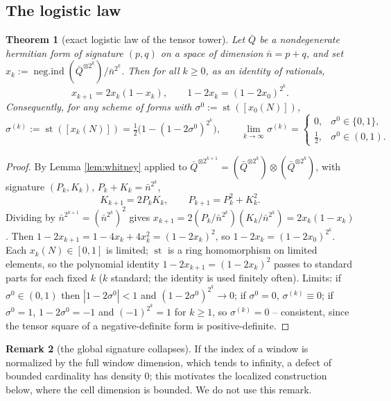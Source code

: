 \documentclass[11pt,reqno]{amsart}
\newtheorem{theorem}{Theorem}[section]
\theoremstyle{definition}
\newtheorem{remark}[theorem]{Remark}
\newcommand{\negind}{\operatorname{neg.ind}}
\newcommand{\sst}{\operatorname{st}}
\begin{document}
\subsection{The logistic law}

\begin{theorem}[exact logistic law of the tensor tower]\label{thm:logistic}
Let \(\bar Q\) be a nondegenerate hermitian form of signature \((p,q)\) on a
space of dimension \(\bar n=p+q\), and set
\(x_k:=\negind(\bar Q^{\otimes 2^k})/\bar n^{2^k}\). Then for all \(k\geq0\), as
an identity of rationals,
\[
x_{k+1}=2x_k(1-x_k),\qquad 1-2x_k=(1-2x_0)^{2^k}.
\]
Consequently, for any scheme of forms with \(\sigma^0:=\sst([x_0(N)])\),
\[
\sigma^{(k)}:=\sst([x_k(N)])=\tfrac12\bigl(1-(1-2\sigma^0)^{2^k}\bigr),
\qquad
\lim_{k\to\infty}\sigma^{(k)}=
\begin{cases}0,&\sigma^0\in\{0,1\},\\[2pt]\tfrac12,&\sigma^0\in(0,1).\end{cases}
\]
\end{theorem}

\begin{proof}
By Lemma \ref{lem:whitney} applied to
\(\bar Q^{\otimes 2^{k+1}}=(\bar Q^{\otimes 2^k})\otimes(\bar Q^{\otimes 2^k})\),
with signature \((P_k,K_k)\), \(P_k+K_k=\bar n^{2^k}\),
\[
K_{k+1}=2P_kK_k,\qquad P_{k+1}=P_k^2+K_k^2.
\]
Dividing by \(\bar n^{2^{k+1}}=(\bar n^{2^k})^2\) gives
\(x_{k+1}=2(P_k/\bar n^{2^k})(K_k/\bar n^{2^k})=2x_k(1-x_k)\). Then
\(1-2x_{k+1}=1-4x_k+4x_k^2=(1-2x_k)^2\), so \(1-2x_k=(1-2x_0)^{2^k}\). Each
\(x_k(N)\in[0,1]\) is limited; \(\sst\) is a ring homomorphism on limited
elements, so the polynomial identity \(1-2x_{k+1}=(1-2x_k)^2\) passes to
standard parts for each fixed \(k\) (\(k\) standard; the identity is used
finitely often). Limits: if \(\sigma^0\in(0,1)\) then \(|1-2\sigma^0|<1\) and
\((1-2\sigma^0)^{2^k}\to0\); if \(\sigma^0=0\), \(\sigma^{(k)}\equiv0\); if
\(\sigma^0=1\), \(1-2\sigma^0=-1\) and \((-1)^{2^k}=1\) for \(k\geq1\), so
\(\sigma^{(k)}=0\) -- consistent, since the tensor square of a negative-definite
form is positive-definite.
\end{proof}

\begin{remark}[the global signature collapses]\label{rem:collapse}
If the index of a window is normalized by the full window dimension, which tends
to infinity, a defect of bounded cardinality has density \(0\); this motivates
the localized construction below, where the cell dimension is bounded. We do not
use this remark.
\end{remark}
\end{document}

